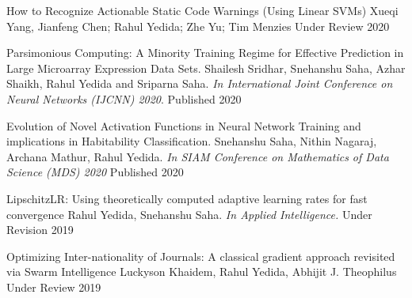 


\begin{cvhonors}

    \cvhonor
        {How to Recognize Actionable Static Code Warnings (Using Linear SVMs)}
        {Xueqi Yang, Jianfeng Chen; Rahul Yedida; Zhe Yu; Tim Menzies}
        {Under Review}
        {2020}

    \cvhonor
        {Parsimonious Computing: A Minority Training Regime for Effective Prediction in Large Microarray Expression Data Sets.}
        {Shailesh Sridhar, Snehanshu Saha, Azhar Shaikh, Rahul Yedida and Sriparna Saha.  \textit{In International Joint Conference on Neural Networks (IJCNN) 2020}.}
        {Published}
        {2020}

    \cvhonor
        {Evolution of Novel Activation Functions in Neural Network Training and implications in Habitability Classification.}
        {Snehanshu Saha, Nithin Nagaraj, Archana Mathur, Rahul Yedida. \textit{In SIAM Conference on Mathematics of Data Science (MDS) 2020}}
        {Published}
        {2020}

  \cvhonor
    {LipschitzLR: Using theoretically computed adaptive learning rates for fast convergence}
    {Rahul Yedida, Snehanshu Saha. \textit{In Applied Intelligence.}}
    {Under Revision} %
    {2019} %

  \cvhonor
    {Optimizing Inter-nationality of Journals: A classical gradient approach revisited via Swarm Intelligence}
    {Luckyson Khaidem, Rahul Yedida, Abhijit J. Theophilus}
    {Under Review} %
    {2019} %
    
\end{cvhonors}